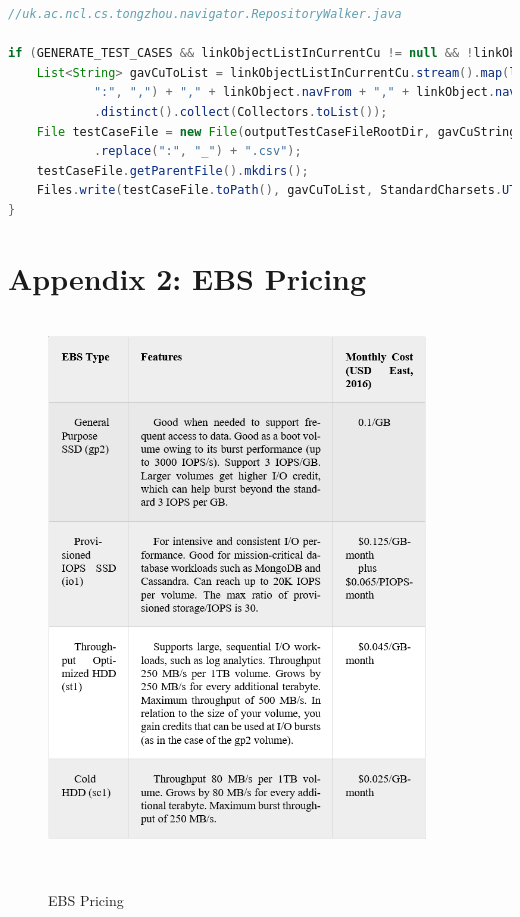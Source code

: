 \documentclass[runningheads]{llncs}
\begin{document}
\begin{lstlisting}[language=Java, caption=Generating test cases for automation test ]
//uk.ac.ncl.cs.tongzhou.navigator.RepositoryWalker.java

if (GENERATE_TEST_CASES && linkObjectListInCurrentCu != null && !linkObjectListInCurrentCu.isEmpty()) {
	List<String> gavCuToList = linkObjectListInCurrentCu.stream().map(linkObject -> gavCuString.replace(
			":", ",") + "," + linkObject.navFrom + "," + linkObject.navTo)
			.distinct().collect(Collectors.toList());
	File testCaseFile = new File(outputTestCaseFileRootDir, gavCuString
			.replace(":", "_") + ".csv");
	testCaseFile.getParentFile().mkdirs();
	Files.write(testCaseFile.toPath(), gavCuToList, StandardCharsets.UTF_8);
}
\end{lstlisting}

\newpage
\section*{Appendix 2: EBS Pricing}

\begin{figure}[H]
    \centering
    \includegraphics[width=10cm]{pic/ebs-pricing.png}
    \caption{EBS Pricing\cite{aws-ebs-pricing}}
    \label{EBS Pricing}
\end{figure}
\end{document}
